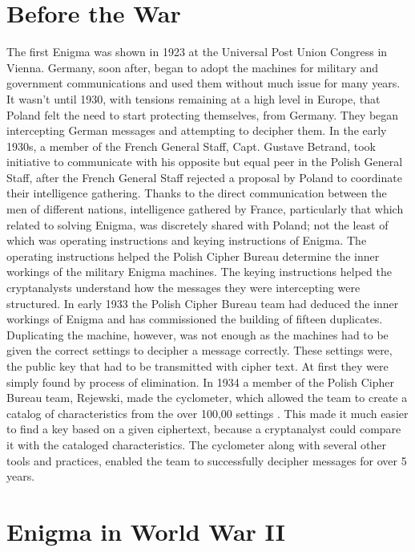 \section{Before the War}

The first Enigma was shown in 1923 at the Universal Post Union Congress in Vienna. Germany, soon after, began to adopt the machines for military and government communications and used them without much issue for many years. It wasn’t until 1930, with tensions remaining at a high level in Europe, that Poland felt the need to start protecting themselves, from Germany. They began intercepting German messages and attempting to decipher them. In the early 1930s, a member of the French General Staff, Capt. Gustave Betrand, took initiative to communicate with his opposite but equal peer in the Polish General Staff, after the French General Staff rejected a proposal by Poland to coordinate their intelligence gathering. Thanks to the direct communication between the men of different nations, intelligence gathered by France, particularly that which related to solving Enigma, was discretely shared with Poland; not the least of which was operating instructions and keying instructions of Enigma. The operating instructions helped the Polish Cipher Bureau determine the inner workings of the military Enigma machines. The keying instructions helped the cryptanalysts understand how the messages they were intercepting were structured. In early 1933 the Polish Cipher Bureau team had deduced the inner workings of Enigma and has commissioned the building of fifteen duplicates. Duplicating the machine, however, was not enough as the machines had to be given the correct settings to decipher a message correctly. These settings were, the public key that had to be transmitted with cipher text. At first they were simply found by process of elimination. In 1934 a member of the Polish Cipher Bureau team, Rejewski, made the cyclometer, which allowed the team to create a catalog of characteristics from the over 100,00 settings \cite{rfc01}. This made it much easier to find a key based on a given ciphertext, because a cryptanalyst could compare it with the cataloged characteristics. The cyclometer along with several other tools and practices, enabled the team to successfully decipher messages for over 5 years. 

\section{Enigma in World War II}

